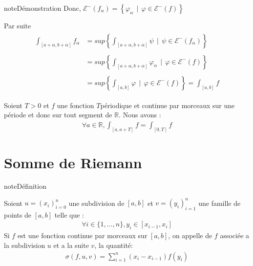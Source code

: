 \documentclass[letterpaper,10pt,french]{sphinxmanual}
\begin{document}
\begin{sphinxadmonition}{note}{Démonstration}
\sphinxAtStartPar
Donc, \(\mathcal E^-(f_\alpha)= \left\{\varphi_\alpha ~~ | ~~ \varphi \in \mathcal E^-(f) \right\}\)

\sphinxAtStartPar
Par suite
\begin{equation*}
\begin{split}
\begin{aligned}
\int_{[a+\alpha, b+\alpha]} f_{\alpha} &= sup \left\{\int_{[a+\alpha, b+\alpha]} \psi ~~| ~~ \psi \in \mathcal E^-(f_\alpha) \right\} \\ \\
&= sup \left\{\int_{[a+\alpha, b+\alpha]} \varphi_\alpha ~~| ~~ \varphi \in \mathcal E^-(f) \right\} \\ \\
&= sup \left\{\int_{[a, b]} \varphi ~~| ~~ \varphi \in \mathcal E^-(f) \right\} = \int_{[a, b]} f
\end{aligned}
\end{split}
\end{equation*}\end{sphinxadmonition}

\sphinxAtStartPar
Soient \(T>0\) et \(f\) une fonction \(T\)\sphinxhyphen{}périodique et continue par morceaux sur une période et donc sur tout segment de \(\mathbb R\). Nous avons :
\begin{equation*}
\begin{split}
\forall a \in \mathbb R, \int_{[a, a+ T]} f = \int_{[0, T]}f
\end{split}
\end{equation*}

\section{Somme de Riemann}
\label{\detokenize{sumreiman:somme-de-riemann}}\label{\detokenize{sumreiman::doc}}
\begin{sphinxadmonition}{note}{Définition}

\sphinxAtStartPar
Soient \(u=(x_i)_{i=0}^n\) une subdivision de \([a, b]\) et \(v=(y_i)_{i=1}^n\) une famille de points de \([a, b]\) telle que :
\begin{equation*}
\begin{split}
\forall i \in \{1, \ldots, n\}, y_i \in [x_{i-1}, x_i]
\end{split}
\end{equation*}
\sphinxAtStartPar
Si \(f\) est une fonction continue par morceaux sur \([a, b]\), on appelle  de \(f\) associée a la subdivision \(u\) et a la suite \(v\), la quantité:
\begin{equation*}
\begin{split}
\sigma(f, u, v)= \sum_{i=1}^n(x_i-x_{i-1})f(y_i)
\end{split}
\end{equation*}\end{sphinxadmonition}
\end{document}
